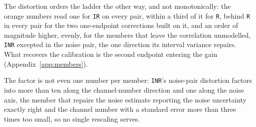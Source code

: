 The distortion orders the ladder the other way, and not monotonically: the orange numbers read one
for \texttt{IR} on every pair, within a third of it for \texttt{R}, behind \texttt{R} in every pair
for the two one-endpoint corrections built on it, and an order of magnitude higher, evenly, for the
members that leave the correlation unmodelled, \texttt{INR} excepted in the noise pair, the one
direction its interval variance repairs. What recovers the calibration is the second endpoint
entering the gain (Appendix~\ref{app:members}).

The factor is not even one number per member: \texttt{INR}'s noise-pair distortion factors into
more than ten along the channel-number direction and one along the noise axis, the member that
repairs the noise estimate reporting the noise uncertainty exactly right and the channel number
with a standard error more than three times too small, so no single rescaling serves. %


